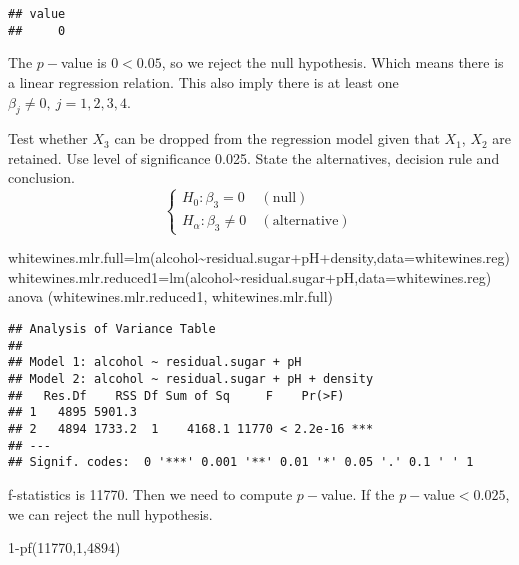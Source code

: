 \documentclass[
]{article}
\newenvironment{Shaded}{\begin{snugshade}}{\end{snugshade}}
\newcommand{\AttributeTok}[1]{\textcolor[rgb]{0.77,0.63,0.00}{#1}}
\newcommand{\DecValTok}[1]{\textcolor[rgb]{0.00,0.00,0.81}{#1}}
\newcommand{\FunctionTok}[1]{\textcolor[rgb]{0.00,0.00,0.00}{#1}}
\newcommand{\NormalTok}[1]{#1}
\newcommand{\OtherTok}[1]{\textcolor[rgb]{0.56,0.35,0.01}{#1}}
\newcommand{\SpecialCharTok}[1]{\textcolor[rgb]{0.00,0.00,0.00}{#1}}
\begin{document}
\begin{verbatim}
## value 
##     0
\end{verbatim}

The \(p-\)value is \(0<0.05\), so we reject the null hypothesis. Which
means there is a linear regression relation. This also imply there is at
least one \(\beta_j\neq0,\ j=1,2,3,4\).

Test whether \(X_3\) can be dropped from the regression model given that
\(X_1\), \(X_2\) are retained. Use level of significance 0.025. State
the alternatives, decision rule and conclusion. \[
\left\{\begin{array}{l}
H_{0}: \beta_3=0\ &(\text{null})\\
H_{\alpha}:\beta_3\neq0\ &(\text{alternative})
\end{array}\right.
\]

\begin{Shaded}
\begin{Highlighting}[]
\NormalTok{whitewines.mlr.full}\OtherTok{=}\FunctionTok{lm}\NormalTok{(alcohol}\SpecialCharTok{\textasciitilde{}}\NormalTok{residual.sugar}\SpecialCharTok{+}\NormalTok{pH}\SpecialCharTok{+}\NormalTok{density,}\AttributeTok{data=}\NormalTok{whitewines.reg)}
\NormalTok{whitewines.mlr.reduced1}\OtherTok{=}\FunctionTok{lm}\NormalTok{(alcohol}\SpecialCharTok{\textasciitilde{}}\NormalTok{residual.sugar}\SpecialCharTok{+}\NormalTok{pH,}\AttributeTok{data=}\NormalTok{whitewines.reg)}
\FunctionTok{anova}\NormalTok{ (whitewines.mlr.reduced1, whitewines.mlr.full)}
\end{Highlighting}
\end{Shaded}

\begin{verbatim}
## Analysis of Variance Table
## 
## Model 1: alcohol ~ residual.sugar + pH
## Model 2: alcohol ~ residual.sugar + pH + density
##   Res.Df    RSS Df Sum of Sq     F    Pr(>F)    
## 1   4895 5901.3                                 
## 2   4894 1733.2  1    4168.1 11770 < 2.2e-16 ***
## ---
## Signif. codes:  0 '***' 0.001 '**' 0.01 '*' 0.05 '.' 0.1 ' ' 1
\end{verbatim}

f-statistics is 11770. Then we need to compute \(p-\)value. If the
\(p-\)value\(<0.025\), we can reject the null hypothesis.

\begin{Shaded}
\begin{Highlighting}[]
\DecValTok{1}\SpecialCharTok{{-}}\FunctionTok{pf}\NormalTok{(}\DecValTok{11770}\NormalTok{,}\DecValTok{1}\NormalTok{,}\DecValTok{4894}\NormalTok{)}
\end{Highlighting}
\end{Shaded}
\end{document}
